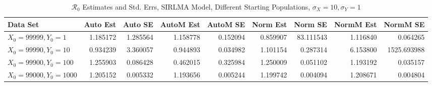\documentclass[12pt]{article}
\newcommand{\rr}{\ensuremath{\mathcal{R}_0}}
\begin{document}
\begin{table}[H]
	
	\caption{$\rr$ Estimates and Std. Errs, SIRLMA Model,
		Different Starting Populations, 
		$\sigma_X = 10, \sigma_Y = 1$}
	\begin{footnotesize}
		\hskip -1.7cm
		\begin{tabular}{l|r|r|r|r|r|r|r|r}
			\hline
			Data Set & Auto Est & Auto SE & AutoM Est & AutoM SE & Norm Est & Norm SE & NormM Est & NormM SE\\
			\hline
			$X_0 = 99999, Y_0 = 1$ & 1.185172 & 1.285564 & 1.158778 & 0.152094 & 0.859907 & 83.111543 & 1.116840 & 0.064265\\
			\hline
			$X_0 = 99990, Y_0 = 10$ & 0.934239 & 3.360057 & 0.944893 & 0.034982 & 1.101154 & 0.287314 & 6.153800 & 1525.693988\\
			\hline
			$X_0 = 99900, Y_0 = 100$ & 1.255903 & 0.086428 & 0.462015 & 0.325984 & 1.250009 & 0.051102 & 1.193192 & 0.035157\\
			\hline
			$X_0 = 99000, Y_0 = 1000$ & 1.205152 & 0.005332 & 1.193656 & 0.005244 & 1.199742 & 0.004094 & 1.208671 & 0.004804\\
			\hline
		\end{tabular}
	\end{footnotesize}
\end{table}
\end{document}
